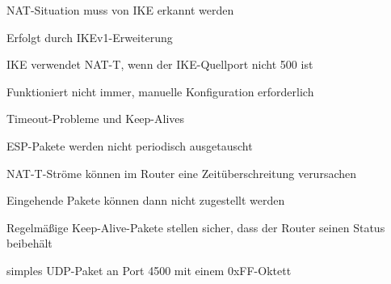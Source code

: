 \documentclass[a4paper]{article}
\begin{document}
\begin{multicols}{3}
\begin{itemize*}
            \begin{itemize*}
                  \item NAT-Situation muss von IKE erkannt werden
                  \item Erfolgt durch IKEv1-Erweiterung
                  \item IKE verwendet NAT-T, wenn der IKE-Quellport nicht 500 ist
                  \item Funktioniert nicht immer, manuelle Konfiguration erforderlich
            \end{itemize*}
            \item Timeout-Probleme und Keep-Alives
            \begin{itemize*}
                  \item ESP-Pakete werden nicht periodisch ausgetauscht
                  \item NAT-T-Ströme können im Router eine Zeitüberschreitung verursachen
                  \item Eingehende Pakete können dann nicht zugestellt werden
                  \item Regelmäßige Keep-Alive-Pakete stellen sicher, dass der Router seinen Status beibehält
                  \item simples UDP-Paket an Port 4500 mit einem 0xFF-Oktett
            \end{itemize*}
      \end{itemize*}


\end{multicols}
\end{document}

